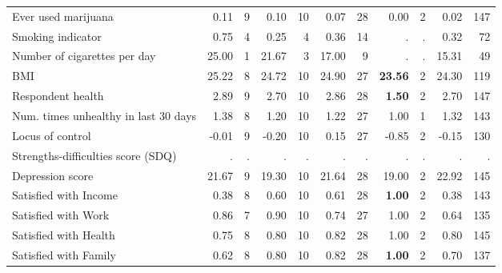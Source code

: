 \begin{tabular}{l r r r r r r r r r r}
Ever used marijuana &      0.11 &         9 &      0.10 &        10 &      0.07 &        28 &      0.00 &         2 &      0.02 &       147 \\
Smoking indicator &      0.75 &         4 &      0.25 &         4 &      0.36 &        14 &         . & . &      0.32 &        72 \\
Number of cigarettes per day &     25.00 &         1 &     21.67 &         3 &     17.00 &         9 &         . & . &     15.31 &        49 \\
BMI &     25.22 &         8 &     24.72 &        10 &     24.90 &        27 & \textbf{    23.56} &         2 &     24.30 &       119 \\
Respondent health &      2.89 &         9 &      2.70 &        10 &      2.86 &        28 & \textbf{     1.50} &         2 &      2.70 &       147 \\
Num. times unhealthy in last 30 days &      1.38 &         8 &      1.20 &        10 &      1.22 &        27 &      1.00 &         1 &      1.32 &       143 \\
Locus of control &     -0.01 &         9 &     -0.20 &        10 &      0.15 &        27 &     -0.85 &         2 &     -0.15 &       130 \\
Strengths-difficulties score (SDQ) &         . & . &         . & . &         . & . &         . & . &         . & . \\
Depression score &     21.67 &         9 &     19.30 &        10 &     21.64 &        28 &     19.00 &         2 &     22.92 &       145 \\
Satisfied with Income &      0.38 &         8 &      0.60 &        10 &      0.61 &        28 & \textbf{     1.00} &         2 &      0.38 &       143 \\
Satisfied with Work &      0.86 &         7 &      0.90 &        10 &      0.74 &        27 &      1.00 &         2 &      0.64 &       135 \\
Satisfied with Health &      0.75 &         8 &      0.80 &        10 &      0.82 &        28 &      1.00 &         2 &      0.80 &       145 \\
Satisfied with Family &      0.62 &         8 &      0.80 &        10 &      0.82 &        28 & \textbf{     1.00} &         2 &      0.70 &       137 \\
\bottomrule
\end{tabular}
